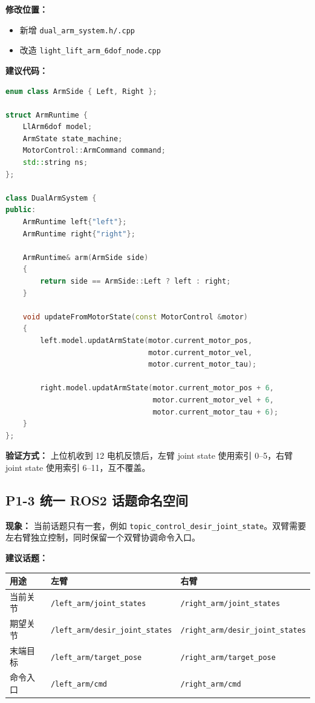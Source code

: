 \documentclass[UTF8,a4paper,11pt]{ctexart}
\begin{document}
\textbf{修改位置：}
\begin{itemize}[leftmargin=2em]
  \item 新增 \verb|dual_arm_system.h/.cpp|
  \item 改造 \verb|light_lift_arm_6dof_node.cpp|
\end{itemize}

\textbf{建议代码：}
\begin{lstlisting}[language=C++]
enum class ArmSide { Left, Right };

struct ArmRuntime {
    LlArm6dof model;
    ArmState state_machine;
    MotorControl::ArmCommand command;
    std::string ns;
};

class DualArmSystem {
public:
    ArmRuntime left{"left"};
    ArmRuntime right{"right"};

    ArmRuntime& arm(ArmSide side)
    {
        return side == ArmSide::Left ? left : right;
    }

    void updateFromMotorState(const MotorControl &motor)
    {
        left.model.updatArmState(motor.current_motor_pos,
                                 motor.current_motor_vel,
                                 motor.current_motor_tau);

        right.model.updatArmState(motor.current_motor_pos + 6,
                                  motor.current_motor_vel + 6,
                                  motor.current_motor_tau + 6);
    }
};
\end{lstlisting}

\textbf{验证方式：} 上位机收到 12 电机反馈后，左臂 joint state 使用索引 0--5，右臂 joint state 使用索引 6--11，互不覆盖。

\subsection{P1-3 统一 ROS2 话题命名空间}

\textbf{现象：} 当前话题只有一套，例如 \verb|topic_control_desir_joint_state|。双臂需要左右臂独立控制，同时保留一个双臂协调命令入口。

\textbf{建议话题：}
\begin{longtable}{lll}
\toprule
用途 & 左臂 & 右臂 \\
\midrule
当前关节 & \verb|/left_arm/joint_states| & \verb|/right_arm/joint_states| \\
期望关节 & \verb|/left_arm/desir_joint_states| & \verb|/right_arm/desir_joint_states| \\
末端目标 & \verb|/left_arm/target_pose| & \verb|/right_arm/target_pose| \\
命令入口 & \verb|/left_arm/cmd| & \verb|/right_arm/cmd| \\
\bottomrule
\end{longtable}
\end{document}
